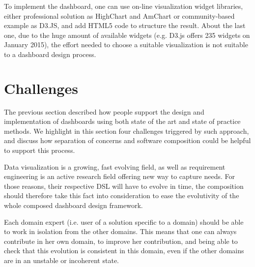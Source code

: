 \documentclass{acm_proc_article-sp}
\begin{document}
To implement the dashboard, one can use on-line visualization widget libraries, either professional solution as HighChart and AmChart or community-based example as D3.JS, and add HTML5 code to structure the result.
About the last one, due to the huge amount of available widgets (e.g. D3.js
offers 235 widgets on January 2015), the effort needed to choose a suitable
visualization is not suitable to a dashboard design process. 


\section{Challenges}

The previous section described how people support the design and
implementation of dashboards using both state of the art and state of
practice methods. We highlight in this section four challenges
triggered by such approach, and discuss how separation of concerns and
software composition could be helpful to support this process.


Data visualization is a growing, fast evolving field, as well as
requirement engineering is an active research field offering new way
to capture needs.  For those reasons, their respective DSL will have
to evolve in time, the composition should therefore take this fact
into consideration to ease the evolutivity of the whole composed
dashboard design framework.

Each domain expert (i.e. user of a solution specific to a domain)
should be able to work in isolation from the other domains. This means
that one can always contribute in her own domain, to improve her
contribution, and being able to check that this evolution is
consistent in this domain, even if the other domains are in an
unstable or incoherent state.
\end{document}
